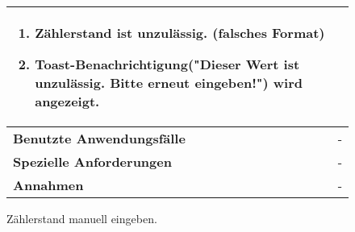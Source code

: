 \begin{figure}[h]
\begin{tabularx}{\textwidth}{ X | X }
\begin{enumerate}
			\item Zählerstand ist unzulässig. (falsches Format)
			\item Toast-Benachrichtigung("Dieser Wert ist unzulässig. Bitte erneut eingeben!") wird angezeigt. 
		\end{enumerate}  \\ \hline
		\textbf{Benutzte Anwendungsfälle} & - \\ \hline
		\textbf{Spezielle Anforderungen} & - \\ \hline
		\textbf{Annahmen} & -
	\end{tabularx}
	\caption{Zählerstand manuell eingeben.}
	\label{fig:anwendungsfall-server-tabelle-xx-1}
\end{figure}

